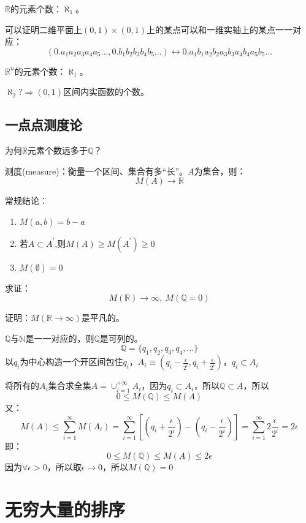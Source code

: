 $\mathbb{R}$的元素个数：$\aleph_1$。

可以证明二维平面上$(0,1)\times(0,1)$上的某点可以和一维实轴上的某点一一对应：
\[(0.a_{1}a_{2}a_{3}a_{4}a_{5}...,0.b_{1}b_{2}b_{3}b_{4}b_{5}...)\leftrightarrow0.a_{1}b_{1}a_{2}b_{2}a_{3}b_{3}a_{4}b_{4}a_{5}b_{5}...\]

$\mathbb{R}^n$的元素个数：$\aleph_1$。

$\aleph_2?\Rightarrow(0,1)$区间内实函数的个数。

\subsection{一点点测度论}
\label{yddcdl}

为何$\mathbb{R}$元素个数远多于$\mathbb{Q}$？

测度(measure)：衡量一个区间、集合有多“长”。$A$为集合，则：
\[M(A)\rightarrow\mathbb{R}\]

常规结论：

\begin{enumerate}[fullwidth,itemindent=2em]
	\item $M{(a,b)} = b-a$
	\item 若$A\subset A^\prime$,则$M(A) \ge M(A^\prime) \ge 0$
	\item $M(\emptyset) = 0$
\end{enumerate}

求证：
\begin{equation}
M(\mathbb{R})\rightarrow \infty,\ M(\mathbb{Q}=0)
\end{equation}

证明：$M(\mathbb{R}\rightarrow \infty)$是平凡的。

$\mathbb{Q}$与$\mathbb{N}$是一一对应的，则$\mathbb{Q}$是可列的。\\
\[\mathbb{Q}=\{q_1,q_2,q_3,q_4,...\}\]
以$q_i$为中心构造一个开区间包住$q_i$，$A_i \equiv (q_i-\frac{\epsilon}{2^i},q_i+\frac{\epsilon}{2^i})$，${q_i\subset A_i}$

将所有的$A_i$集合求全集$A = \cup_{i=1}^{+\infty}A_i$，因为${q_i \subset A_i}$，所以$\mathbb{Q}\subset A$，所以
\[0 \le M(\mathbb{Q}) \le M(A)\]
又：
\[M(A) \le \sum_{i=1}^{\infty}M(A_i) = \sum_{i=1}^{\infty}[(q_i+\frac{\epsilon}{2^i})-(q_i-\frac{\epsilon}{2^i})] = \sum_{i=1}^{\infty}2\frac{\epsilon}{2^i}=2\epsilon\]
即：
\[0 \le M(\mathbb{Q}) \le M(A) \le 2\epsilon\]
因为$\forall \epsilon >0$，所以取$\epsilon \rightarrow 0$，所以$M(\mathbb{Q})=0$

\section{无穷大量的排序}
\label{wqdldpx}

